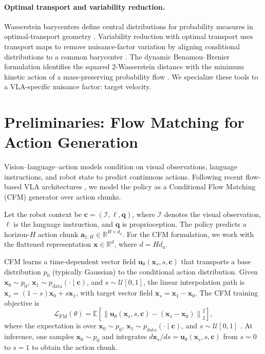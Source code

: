 \documentclass{article} %
\begin{document}
\paragraph{Optimal transport and variability reduction.}
Wasserstein barycenters define central distributions for probability measures in optimal-transport geometry \citep{agueh2011barycenters,villani2009optimal,peyre2019computational}. Variability reduction with optimal transport uses transport maps to remove nuisance-factor variation by aligning conditional distributions to a common barycenter \citep{hung2022variability}. The dynamic Benamou--Brenier formulation identifies the squared $2$-Wasserstein distance with the minimum kinetic action of a mass-preserving probability flow \citep{benamou2000computational,ambrosio2008gradient}. We specialize these tools to a VLA-specific nuisance factor: target velocity.


\section{Preliminaries: Flow Matching for Action Generation}
\label{sec:prelim}

Vision--language--action models condition on visual observations, language
instructions, and robot state to predict continuous actions. Following recent
flow-based VLA architectures \citep{black2025pi0}, we model the policy as a
Conditional Flow Matching (CFM) generator over action chunks.

Let the robot context be
$\mathbf c=(\mathcal I,\ell,\mathbf q)$, where $\mathcal I$ denotes the
visual observation, $\ell$ is the language instruction,
and $\mathbf q$ is proprioception. The policy predicts a horizon-$H$ action
chunk
$\mathbf a_{1:H}\in\mathbb R^{H\times d_a}$.
For the CFM formulation, we work with the flattened
representation $\mathbf x\in\mathbb R^d$, where $d=H d_a$.

CFM learns a time-dependent vector field
$\mathbf u_\theta(\mathbf x_s,s,\mathbf c)$ that transports a base
distribution $p_0$ (typically Gaussian) to the conditional action distribution.
Given
$\mathbf x_0\sim p_0$, $\mathbf x_1\sim p_{\mathrm{data}}(\cdot\mid\mathbf c)$,
and $s\sim\mathcal U[0,1]$, the linear interpolation path is
$\mathbf x_s=(1-s)\mathbf x_0+s\mathbf x_1$,
with target vector field $\dot{\mathbf x}_s=\mathbf x_1-\mathbf x_0$.
The CFM training objective is
\begin{equation}
    \mathcal L_{\mathrm{FM}}(\theta)
    =
    \mathbb E
    \left[
        \left\|
            \mathbf u_\theta(\mathbf x_s,s,\mathbf c)
            -
            (\mathbf x_s-\mathbf x_0)
        \right\|_2^2
    \right],
    \label{eq:fm_loss}
\end{equation}
where the expectation is over
$\mathbf x_0\sim p_0$, $\mathbf x_1\sim p_{\mathrm{data}}(\cdot\mid\mathbf c)$,
and $s\sim\mathcal U[0,1]$ \citep{lipman2023flow,tong2023conditional}.
At inference, one samples $\mathbf x_0\sim p_0$ and integrates
$d\mathbf x_s/ds=\mathbf u_\theta(\mathbf x_s,s,\mathbf c)$ from $s=0$ to
$s=1$ to obtain the action chunk.
\end{document}
